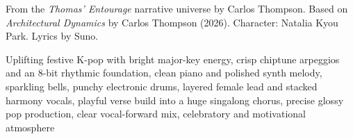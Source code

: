 
\begin{notes}
From the \emph{Thomas’ Entourage} narrative universe by Carlos Thompson. Based on \emph{Architectural Dynamics} by Carlos Thompson (2026). Character: Natalia Kyou Park. Lyrics by Suno.
\end{notes}
\begin{style}
Uplifting festive K-pop with bright major-key energy, crisp chiptune arpeggios and an 8-bit rhythmic foundation, clean piano and polished synth melody, sparkling bells, punchy electronic drums, layered female lead and stacked harmony vocals, playful verse build into a huge singalong chorus, precise glossy pop production, clear vocal-forward mix, celebratory and motivational atmosphere
\end{style}
